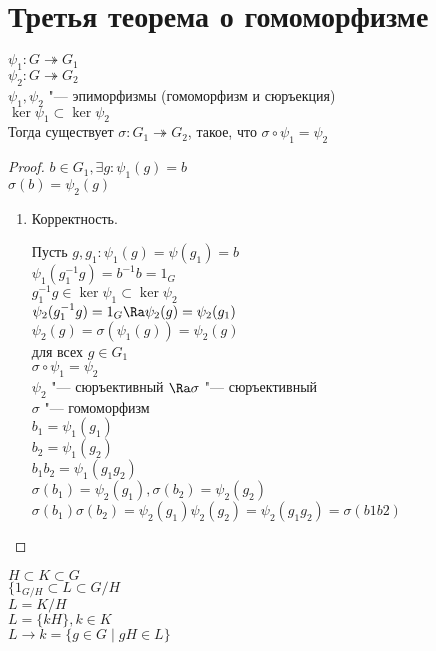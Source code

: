 ﻿\section{Третья теорема о гомоморфизме}
\begin{theorem}
$\psi_1 \colon G \twoheadrightarrow G_1$ \\
$\psi_2 \colon G \twoheadrightarrow G_2$ \\
$\psi_1, \psi_2$ "--- эпиморфизмы (гомоморфизм и сюръекция)\\
$\ker \psi_1 \subset \ker \psi_2$\\
Тогда существует $\sigma \colon G_1 \twoheadrightarrow G_2$, такое, что $\sigma \circ \psi_1 = \psi_2$\\
\end{theorem}
\begin{proof}
$b \in G_1, \exists g \colon \psi_1(g) = b$\\
$\sigma (b) = \psi_2(g)$\\

\begin{enumerate}
\item Корректность.

Пусть $g, g_1 \colon \psi_1(g) = \psi(g_1) = b$\\
$\psi_1(g_1^{-1}g) = b^{-1}b = 1_G$\\
$g_1^{-1}g \in \ker \psi_1 \subset \ker \psi_2$\\
$\psi_2(g_1^{-1}g) = 1_G \Ra \psi_2(g) = \psi_2(g_1)$\\

$\psi_2(g) = \sigma(\psi_1(g)) = \psi_2(g)$\\
для всех $g \in G_1$\\
$\sigma \circ \psi_1 = \psi_2$\\
$\psi_2$ "--- сюръективный $\Ra \sigma$ "--- сюръективный\\

$\sigma$ "--- гомоморфизм\\
$b_1 = \psi_1(g_1)$\\
$b_2 = \psi_1(g_2)$\\
$b_1b_2 = \psi_1(g_1g_2)$\\

$\sigma(b_1) = \psi_2(g_1), \sigma(b_2) = \psi_2(g_2)$\\
$\sigma(b_1)\sigma(b_2) = \psi_2(g_1) \psi_2(g_2) = \psi_2(g_1g_2) = \sigma(b1b2)$\\
\end{enumerate}
\end{proof}
\begin{Rem}
$H\subset K \subset G$\\
$\{1_{G/H}\subset L \subset G / H$ \\
$L = K /H$\\
$L = \{kH\}, k \in K$\\
$L \to k = \{g \in G \mid gH \in L\}$\\
\end{Rem}

